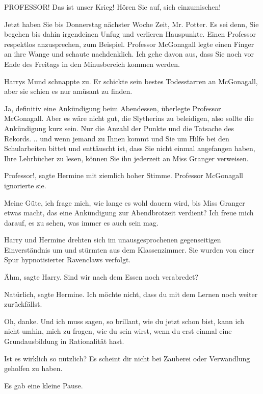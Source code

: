 \glqq{}PROFESSOR! Das ist unser Krieg! Hören Sie auf, sich einzumischen!\grqq{}

\glqq{}Jetzt haben Sie bis Donnerstag nächster Woche Zeit, Mr. Potter. Es sei
denn, Sie begehen bis dahin irgendeinen Unfug und verlieren Hauspunkte. Einen
Professor respektlos anzusprechen, zum Beispiel.\grqq{} Professor McGonagall
legte einen Finger an ihre Wange und schaute nachdenklich. \glqq{}Ich gehe davon
aus, dass Sie noch vor Ende des Freitags in den Minusbereich kommen
werden.\grqq{}

Harrys Mund schnappte zu. Er schickte sein bestes Todesstarren an McGonagall,
aber sie schien es nur amüsant zu finden.

\glqq{}Ja, definitiv eine Ankündigung beim Abendessen\grqq{}, überlegte
Professor McGonagall. \glqq{}Aber es wäre nicht gut, die Slytherins zu
beleidigen, also sollte die Ankündigung kurz sein. Nur die Anzahl der Punkte und
die Tatsache des Rekords. .. und wenn jemand zu Ihnen kommt und Sie um Hilfe bei
den Schularbeiten bittet und enttäuscht ist, dass Sie nicht einmal angefangen
haben, Ihre Lehrbücher zu lesen, können Sie ihn jederzeit an Miss Granger
verweisen.\grqq{}

\glqq{}Professor!\grqq{}, sagte Hermine mit ziemlich hoher Stimme. Professor
McGonagall ignorierte sie.

\glqq{}Meine Güte, ich frage mich, wie lange es wohl dauern wird, bis Miss
Granger etwas macht, das eine Ankündigung zur Abendbrotzeit verdient? Ich freue
mich darauf, es zu sehen, was immer es auch sein mag.\grqq{}

Harry und Hermine drehten sich im unausgesprochenen gegenseitigen Einverständnis
um und stürmten aus dem Klassenzimmer. Sie wurden von einer Spur hypnotisierter
Ravenclaws verfolgt.

\glqq{}Ähm\grqq{}, sagte Harry. \glqq{}Sind wir nach dem Essen noch
verabredet?\grqq{}

\glqq{}Natürlich\grqq{}, sagte Hermine. \glqq{}Ich möchte nicht, dass du mit dem
Lernen noch weiter zurückfällst.\grqq{}

\glqq{}Oh, danke. Und ich muss sagen, so brillant, wie du jetzt schon bist, kann
ich nicht umhin, mich zu fragen, wie du sein wirst, wenn du erst einmal eine
Grundausbildung in Rationalität hast.\grqq{}

\glqq{}Ist es wirklich so nützlich? Es scheint dir nicht bei Zauberei oder
Verwandlung geholfen zu haben.\grqq{}

Es gab eine kleine Pause.

